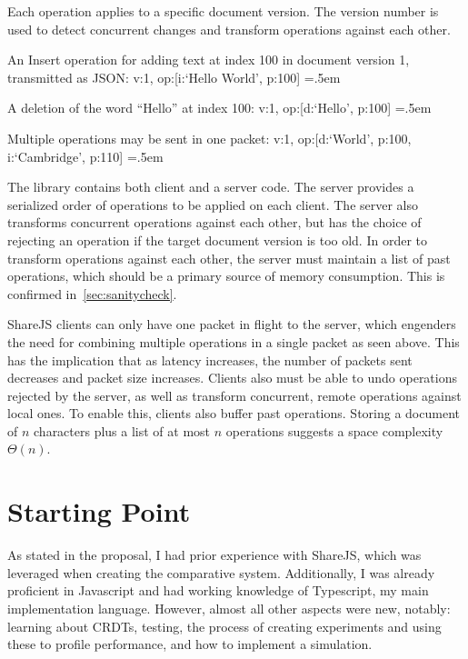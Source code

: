 \documentclass[12pt,a4paper,twoside,openright]{report}
\newenvironment{lcverbatim}
 {\SaveVerbatim{cverb}}
 {\endSaveVerbatim
  \flushleft\fboxrule=0pt\fboxsep=.5em
  \colorbox{cverbbg}{%
    \makebox[\dimexpr\linewidth-2\fboxsep][l]{\BUseVerbatim{cverb}}%
  }
  \endflushleft
}
\begin{document}
	Each operation applies to a specific document version. The version number is used to detect concurrent changes and transform operations against each other.
	
	An Insert operation for adding text at index 100 in document version 1, transmitted as JSON:
\begin{lcverbatim}
{v:1, op:[{i:`Hello World', p:100}]}
\end{lcverbatim}

	A deletion of the word ``Hello'' at index 100:
\begin{lcverbatim}
{v:1, op:[{d:`Hello', p:100}]}
\end{lcverbatim}

	Multiple operations may be sent in one packet:
\begin{lcverbatim}
{v:1, op:[{d:`World', p:100}, {i:`Cambridge', p:110}]}
\end{lcverbatim}

\vspace{5mm}

	The library contains both client and a server code. The server provides a serialized order of operations to be applied on each client. The server also transforms concurrent operations against each other, but has the choice of rejecting an operation if the target document version is too old. In order to transform operations against each other, the server must maintain a list of past operations, which should be a primary source of memory consumption. This is confirmed in~\cref{sec:sanitycheck}.
	
	ShareJS clients can only have one packet in flight to the server, which engenders the need for combining multiple operations in a single packet as seen above. This has the implication that as latency increases, the number of packets sent decreases and packet size increases. Clients also must be able to undo operations rejected by the server, as well as transform concurrent, remote operations against local ones. To enable this, clients also buffer past operations. Storing a document of $n$ characters plus a list of at most $n$ operations suggests a space complexity $\Theta (n)$.

	
\section{Starting Point}

As stated in the proposal, I had prior experience with ShareJS, which was leveraged when creating the comparative system. Additionally, I was already proficient in Javascript and had working knowledge of Typescript, my main implementation language. However, almost all other aspects were new, notably: learning about CRDTs, testing, the process of creating experiments and using these to profile performance, and how to implement a simulation.
\end{document}

